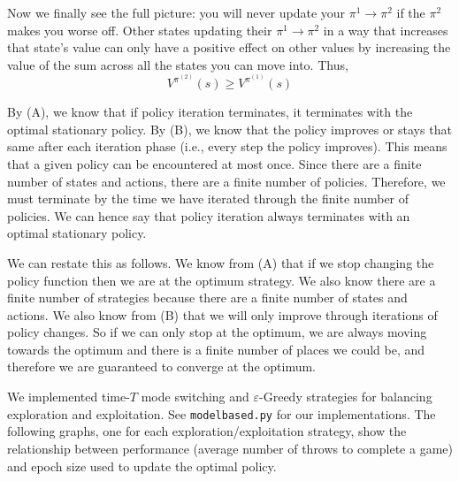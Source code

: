 \documentclass[solution, letterpaper]{cs121}
\begin{document}
Now we finally see the full picture: you will never update your $\pi^1 \rightarrow \pi^2$ if the $\pi^2$ makes you worse off. Other states updating their $\pi^1 \rightarrow \pi^2$ in a way that increases that state's value can only have a positive effect on other values by increasing the value of the sum across all the states you can move into. Thus, \[ V^{\pi^{(2)}} (s) \ge V^{\pi^{(1)}}(s) \]

\subproblem{} %
By (A), we know that if policy iteration terminates, it terminates with the optimal stationary policy. By (B), we know that the policy improves or stays that same after each iteration phase (i.e., every step the policy improves). This means that a given policy can be encountered at most once. Since there are a finite number of states and actions, there are a finite number of policies. Therefore, we must terminate by the time we have iterated through the finite number of policies. We can hence say that policy iteration always terminates with an optimal stationary policy.

We can restate this as follows. We know from (A) that if we stop changing the policy function then we are at the optimum strategy. We also know there are a finite number of strategies because there are a finite number of states and actions. We also know from (B) that we will only improve through iterations of policy changes. So if we can only stop at the optimum, we are always moving towards the optimum and there is a finite number of places we could be, and therefore we are guaranteed to converge at the optimum.



\subproblem{} %
We implemented time-$T$ mode switching and $\varepsilon$-Greedy strategies for balancing exploration and exploitation. See {\tt modelbased.py} for our implementations. The following graphs, one for each exploration/exploitation strategy, show the relationship between performance (average number of throws to complete a game) and epoch size used to update the optimal policy.
\end{document}
